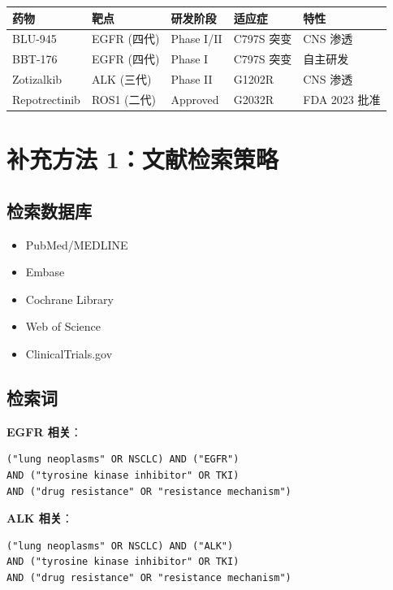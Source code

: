 \documentclass[12pt,a4paper]{article}
\begin{document}
\begin{table}[h]
\centering
\begin{tabular}{p{2cm}p{2.5cm}p{2.5cm}p{3cm}p{2.5cm}}
\toprule
\textbf{药物} & \textbf{靶点} & \textbf{研发阶段} & \textbf{适应症} & \textbf{特性} \\
\midrule
BLU-945 & EGFR (四代) & Phase I/II & C797S 突变 & CNS 渗透 \\
BBT-176 & EGFR (四代) & Phase I & C797S 突变 & 自主研发 \\
Zotizalkib & ALK (三代) & Phase II & G1202R & CNS 渗透 \\
Repotrectinib & ROS1 (二代) & Approved & G2032R & FDA 2023 批准 \\
\bottomrule
\end{tabular}
\end{table}

\newpage

\section{补充方法 1：文献检索策略}

\subsection*{检索数据库}
\begin{itemize}
    \item PubMed/MEDLINE
    \item Embase
    \item Cochrane Library
    \item Web of Science
    \item ClinicalTrials.gov
\end{itemize}

\subsection*{检索词}
\textbf{EGFR 相关}：
\begin{verbatim}
("lung neoplasms" OR NSCLC) AND ("EGFR") 
AND ("tyrosine kinase inhibitor" OR TKI)
AND ("drug resistance" OR "resistance mechanism")
\end{verbatim}

\textbf{ALK 相关}：
\begin{verbatim}
("lung neoplasms" OR NSCLC) AND ("ALK")
AND ("tyrosine kinase inhibitor" OR TKI)
AND ("drug resistance" OR "resistance mechanism")
\end{verbatim}
\end{document}
